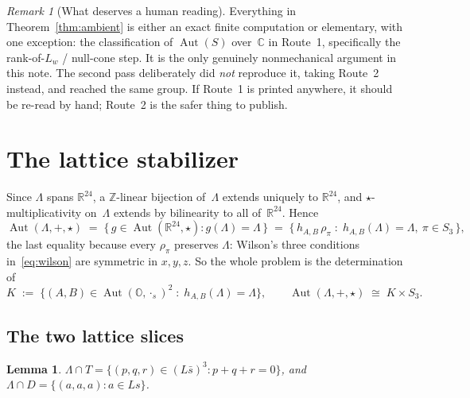 \documentclass[11pt]{amsart}
\newcommand{\LL}{\Lambda}
\newcommand{\OO}{\mathbb{O}}
\newcommand{\ZZ}{\mathbb{Z}}
\newcommand{\RR}{\mathbb{R}}
\newcommand{\CC}{\mathbb{C}}
\DeclareMathOperator{\Aut}{Aut}
\newtheorem{lemma}[theorem]{Lemma}
\theoremstyle{definition}
\theoremstyle{remark}
\newtheorem{remark}[theorem]{Remark}
\begin{document}
\begin{remark}[What deserves a human reading]\label{rem:humanread}
Everything in Theorem~\ref{thm:ambient} is either an exact finite computation
or elementary, with one exception: the classification of $\Aut(S)$ over~$\CC$
in Route~1, specifically the rank-of-$L_w$ / null-cone step. It is the only
genuinely nonmechanical argument in this note. The second pass deliberately
did \emph{not} reproduce it, taking Route~2 instead, and reached the same
group. If Route~1 is printed anywhere, it should be re-read by hand; Route~2
is the safer thing to publish.
\end{remark}

\section{The lattice stabilizer}\label{sec:lattice}

Since $\LL$ spans $\RR^{24}$, a $\ZZ$-linear bijection of~$\LL$ extends
uniquely to $\RR^{24}$, and $\star$-multiplicativity on~$\LL$ extends by
bilinearity to all of~$\RR^{24}$. Hence
\[
  \Aut(\LL, +, \star)
  \;=\; \{\, g \in \Aut(\RR^{24}, \star) : g(\LL) = \LL \,\}
  \;=\; \{\, h_{A,B}\, \rho_\pi \;:\; h_{A,B}(\LL) = \LL,\ \pi \in S_3 \,\},
\]
the last equality because every $\rho_\pi$ preserves $\LL$: Wilson's three
conditions in~\eqref{eq:wilson} are symmetric in $x, y, z$. So the whole
problem is the determination of
\[
  K \;:=\; \bigl\{ (A,B) \in \Aut(\OO,\cdot_s)^2 \;:\;
    h_{A,B}(\LL) = \LL \bigr\},
  \qquad
  \Aut(\LL,+,\star) \;\cong\; K \times S_3 .
\]

\subsection{The two lattice slices}

\begin{lemma}\label{lem:slices}
$\LL \cap T = \{(p,q,r) \in (L\bar s)^3 : p + q + r = 0\}$, and
$\LL \cap D = \{(a,a,a) : a \in Ls\}$.
\end{lemma}
\end{document}
